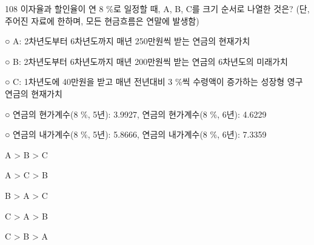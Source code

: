 \begin{question}{108}
이자율과 할인율이 연 8 \%로 일정할 때, A, B, C를 크기 순서로 나열한 것은? (단, 주어진 자료에 한하며, 모든 현금흐름은 연말에 발생함)
\begin{framedtext}
○ A: 2차년도부터 6차년도까지 매년 250만원씩 받는 연금의 현재가치 \par
○ B: 2차년도부터 6차년도까지 매년 200만원씩 받는 연금의 6차년도의 미래가치 \par
○ C: 1차년도에 40만원을 받고 매년 전년대비 3 \%씩 수령액이 증가하는 성장형 영구연금의 현재가치 \par
○ 연금의 현가계수(8 \%, 5년): 3.9927, 연금의 현가계수(8 \%, 6년): 4.6229 \par
○ 연금의 내가계수(8 \%, 5년): 5.8666, 연금의 내가계수(8 \%, 6년): 7.3359 \par
\end{framedtext}
\begin{choices}
  \item A > B > C
  \item A > C > B
  \item B > A > C
  \item C > A > B
  \item C > B > A
\end{choices}
\end{question}
